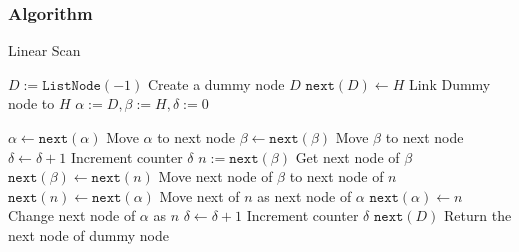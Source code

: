 \subsubsection{Algorithm}
\setcounter{algorithm}{0}
\begin{algorithm}[H]
\caption{Linear Scan}
\begin{algorithmic}[1]
\State $D:=\texttt{ListNode}(-1)$ \Comment Create a dummy node $D$
\State $\texttt{next}(D) \gets H$ \Comment Link Dummy node to $H$
\State $\alpha:=D, \beta:=H, \delta:=0$
\end{algorithmic}
\end{algorithm}
\begin{algorithm}[H]
\begin{algorithmic}[1]
\State $\alpha\gets \texttt{next}(\alpha)$ \Comment Move $\alpha$ to next node
\State $\beta\gets \texttt{next}(\beta)$ \Comment Move $\beta$ to next node
\State $\delta \gets \delta +1$ \Comment Increment counter $\delta$
\EndWhile
{}
\State $n:=\texttt{next}(\beta)$ \Comment Get next node of $\beta$
\State $\texttt{next}(\beta)\gets \texttt{next}(n)$ \Comment Move next node of $\beta$ to next node of $n$
\State $\texttt{next}(n) \gets \texttt{next}(\alpha)$ \Comment Move next of $n$ as next node of $\alpha$
\State $\texttt{next}(\alpha) \gets n$ \Comment Change next node of $\alpha$ as $n$
\State $\delta \gets \delta +1$ \Comment Increment counter $\delta$
\EndWhile
\State \Return $\texttt{next}(D)$ \Comment Return the next node of dummy node
\EndProcedure
\end{algorithmic}
\end{algorithm}
